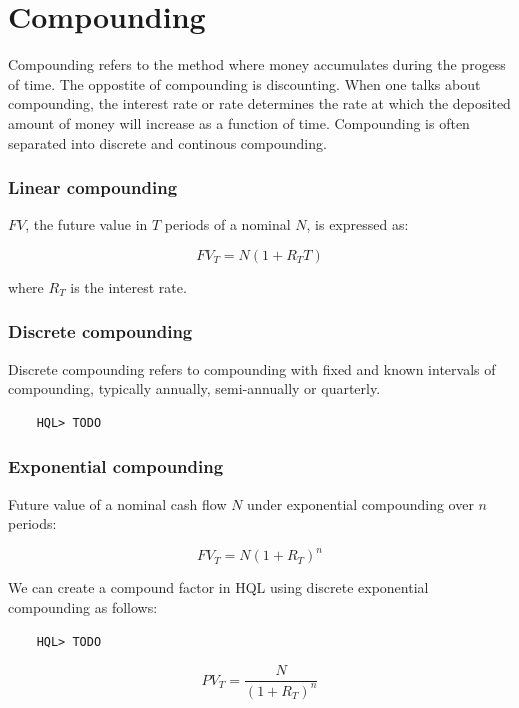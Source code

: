 \documentclass[11pt,a4paper]{article}
\numberwithin{equation}{section}
\begin{document}
	\section{Compounding}
	Compounding refers to the method where money accumulates during the progess of time. The oppostite of compounding is discounting.
	When one talks about compounding, the interest rate or rate determines the rate at which the deposited amount of money will increase as a function of time.
	Compounding is often separated into discrete and continous compounding.


	\subsubsection{Linear compounding}
	$FV$, the future value in $T$ periods of a nominal $N$, is expressed as:

	\[
	FV_T = N(1+R_TT)
	\]

	where $R_T$ is the interest rate.

	\subsubsection{Discrete compounding}
	Discrete compounding refers to compounding with fixed and known intervals of compounding, typically annually, semi-annually or quarterly.

	\FrameSep
	\begin{lstlisting}
	HQL> TODO
	\end{lstlisting}
	\FrameSep



	\subsubsection{Exponential compounding}

	Future value of a nominal cash flow $N$ under exponential compounding over
	$n$ periods:

	\[ FV_T = N(1+R_T)^n \]


	We can create a compound factor in HQL using discrete exponential compounding as follows:

	\FrameSep
	\begin{lstlisting}
	HQL> TODO
	\end{lstlisting}
	\FrameSep

	\[ PV_T = \frac{N}{(1+R_T)^n} \]
\end{document}
